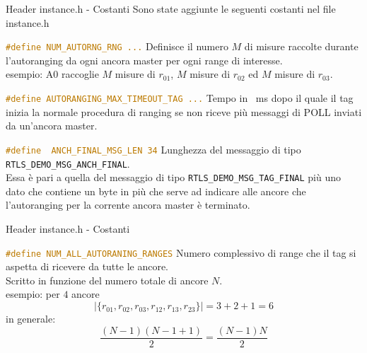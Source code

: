\begin{frame}[fragile, shrink=10]{Header instance.h - Costanti}
  Sono state aggiunte le seguenti costanti nel file instance.h
  \begin{block}{\lstinline[language=C]!#define NUM_AUTORNG_RNG ...!}
  Definisce il numero $M$ di misure raccolte durante l'autoranging da ogni ancora master per ogni range di interesse.\\
  \textcolor{dgreen}{esempio:} A0 raccoglie $M$ misure di $r_{01}$, $M$ misure di $r_{02}$ ed $M$ misure di $r_{03}$.
  \end{block}

  \begin{block}{\lstinline[language=C]!#define AUTORANGING_MAX_TIMEOUT_TAG ...!}
  Tempo in \SI{}{\milli\second} dopo il quale il tag inizia la normale procedura di ranging se non
  riceve più messaggi di POLL inviati da un'ancora master.
  \end{block}

  \begin{block}{\lstinline[language=C]!#define  ANCH_FINAL_MSG_LEN 34!}
    Lunghezza del messaggio di tipo \lstinline[language=C]!RTLS_DEMO_MSG_ANCH_FINAL!.\\
    Essa è pari a quella del messaggio di tipo \lstinline[language=C]!RTLS_DEMO_MSG_TAG_FINAL! più uno dato
    che contiene un byte in più che serve ad indicare alle ancore che l'autoranging per la corrente
    ancora master è terminato.
  \end{block}

\end{frame}

\begin{frame}[fragile]{Header instance.h - Costanti}
  \begin{block}{\lstinline[language=C]!#define NUM_ALL_AUTORANING_RANGES!}
  Numero complessivo di range che il tag si aspetta di ricevere da tutte le ancore.\\
  Scritto in funzione del numero totale di ancore $N$.\\
  \textcolor{dgreen}{esempio:} per $4$ ancore
  \[
  |\{r_{01}, r_{02}, r_{03}, r_{12}, r_{13}, r_{23}\}| = 3 + 2 + 1 = 6
  \]
  \alert{in generale:}
  \[
  \frac{(N-1) (N-1+1)}{2} = \frac{(N-1)N}{2}
  \]
  \end{block}
\end{frame}

